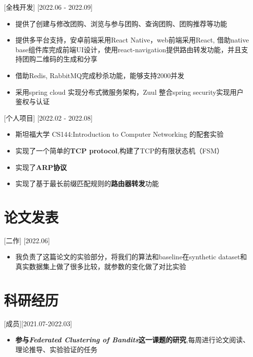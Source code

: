 \documentclass{resume}
\begin{document}
[全栈开发]
[2022.06 - 2022.09] 

\begin{itemize}
    \item 提供了创建与修改团购、浏览与参与团购、查询团购、团购推荐等功能
  \item 提供多平台支持，安卓前端采用React Native，web前端采用React, 借助native base组件库完成前端UI设计，使用react-navigation提供路由转发功能，并且支持团购二维码的生成和分享
    \item 借助Redis, RabbitMQ完成秒杀功能，能够支持2000并发
  \item 采用spring cloud 实现分布式微服务架构，Zuul 整合spring security实现用户鉴权与认证
\end{itemize}

[个人项目]
[2022.02 - 2022.08]  

\begin{itemize}
  \item 斯坦福大学 CS144:Introduction to Computer Networking 的配套实验
  \item 实现了一个简单的\textbf{TCP protocol},构建了TCP的有限状态机（FSM）
  \item 实现了\textbf{ARP协议}
  \item 实现了基于最长前缀匹配规则的\textbf{路由器转发}功能
\end{itemize}

\section{论文发表}
[二作]
[2022.06]  
\begin{itemize}
  \item 我负责了这篇论文的实验部分，将我们的算法和baseline在synthetic dataset和真实数据集上做了很多比较，就参数的变化做了对比实验
\end{itemize}

\section{科研经历}
[成员][2021.07-2022.03] 
\begin{itemize}
  \item \textbf{参与\textit{Federated Clustering of Bandits}这一课题的研究},每周进行论文阅读、理论推导、实验验证的任务
\end{itemize}
\end{document}
